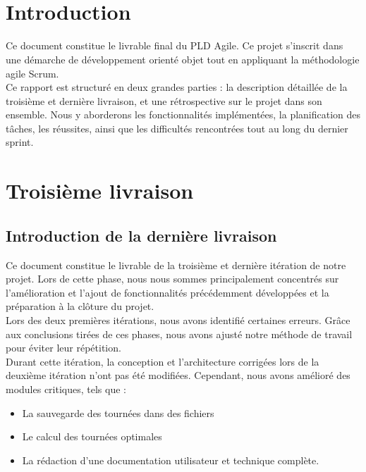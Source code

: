 \documentclass[a4paper]{article}
\begin{document}
\newcommand{\HRule}{\rule{\linewidth}{0.5mm}}



~
\thispagestyle{empty}

\tableofcontents
\thispagestyle{empty}
\setcounter{page}{0}

\renewcommand{\arraystretch}{1.5}

~
\thispagestyle{empty}
\setcounter{page}{0}


\section{Introduction} \label{ch1}
Ce document constitue le livrable final du PLD Agile. Ce projet s’inscrit dans une démarche de développement orienté objet tout en appliquant la méthodologie agile Scrum. \\
\newline
\indent Ce rapport est structuré en deux grandes parties : la description détaillée de la troisième et dernière livraison, et une rétrospective sur le projet dans son ensemble. Nous y aborderons les fonctionnalités implémentées, la planification des tâches, les réussites, ainsi que les difficultés rencontrées tout au long du dernier sprint.

\newpage
\section{Troisième livraison}

\subsection{Introduction de la dernière livraison}
Ce document constitue le livrable de la troisième et dernière itération de notre projet. Lors de cette phase, nous nous sommes principalement concentrés sur l'amélioration et l'ajout de fonctionnalités précédemment développées et la préparation à la clôture du projet.\\
\newline
\indent Lors des deux premières itérations, nous avons identifié certaines erreurs. Grâce aux conclusions tirées de ces phases, nous avons ajusté notre méthode de travail pour éviter leur répétition.\\
\newline
\indent Durant cette itération, la conception et l'architecture corrigées lors de la deuxième itération n'ont pas été modifiées. Cependant, nous avons amélioré des modules critiques, tels que :
\begin{itemize}
    \item La sauvegarde des tournées dans des fichiers
    \item Le calcul des tournées optimales
    \item La rédaction d'une documentation utilisateur et technique complète.
\end{itemize}
\end{document}
